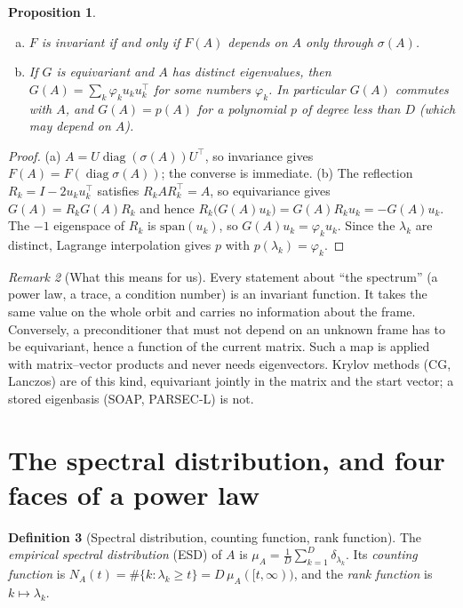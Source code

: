 \documentclass[11pt,a4paper]{article}
\DeclareMathOperator{\diag}{diag}
\theoremstyle{plain}
\newtheorem{proposition}{Proposition}[section]
\theoremstyle{definition}
\newtheorem{definition}[proposition]{Definition}
\theoremstyle{remark}
\newtheorem{remark}[proposition]{Remark}
\begin{document}
\begin{proposition}\label{prop:equivariant}
\begin{enumerate}[(a)]
\item $F$ is invariant if and only if $F(A)$ depends on $A$ only through $\sigma(A)$.
\item If $G$ is equivariant and $A$ has distinct eigenvalues, then $G(A)=\sum_k\varphi_k u_ku_k^\top$ for some
  numbers $\varphi_k$. In particular $G(A)$ commutes with $A$, and $G(A)=p(A)$ for a polynomial $p$ of degree less
  than $D$ (which may depend on $A$).
\end{enumerate}
\end{proposition}
\begin{proof}
(a) $A=U\diag(\sigma(A))U^\top$, so invariance gives $F(A)=F(\diag\sigma(A))$; the converse is immediate.
(b) The reflection $R_k=I-2u_ku_k^\top$ satisfies $R_kAR_k^\top=A$, so equivariance gives $G(A)=R_kG(A)R_k$ and
hence $R_k\bigl(G(A)u_k\bigr)=G(A)R_ku_k=-G(A)u_k$. The $-1$ eigenspace of $R_k$ is $\mathrm{span}(u_k)$, so
$G(A)u_k=\varphi_ku_k$. Since the $\lambda_k$ are distinct, Lagrange interpolation gives $p$ with
$p(\lambda_k)=\varphi_k$.
\end{proof}

\begin{remark}[What this means for us]\label{rem:invariance}
Every statement about ``the spectrum'' (a power law, a trace, a condition number) is an invariant function. It
takes the same value on the whole orbit and carries no information about the frame. Conversely, a preconditioner
that must not depend on an unknown frame has to be equivariant, hence a function of the current matrix. Such a map is
applied with matrix--vector products and never needs eigenvectors. Krylov methods (CG, Lanczos) are of this kind,
equivariant jointly in the matrix and the start vector; a stored eigenbasis (SOAP, PARSEC-L) is not.
\end{remark}

\section{The spectral distribution, and four faces of a power law}\label{sec:faces}

\begin{definition}[Spectral distribution, counting function, rank function]
The \emph{empirical spectral distribution} (ESD) of $A$ is $\mu_A=\frac1D\sum_{k=1}^D\delta_{\lambda_k}$. Its
\emph{counting function} is $N_A(t)=\#\{k:\lambda_k\ge t\}=D\,\mu_A([t,\infty))$, and the \emph{rank function} is
$k\mapsto\lambda_k$.
\end{definition}
\end{document}
